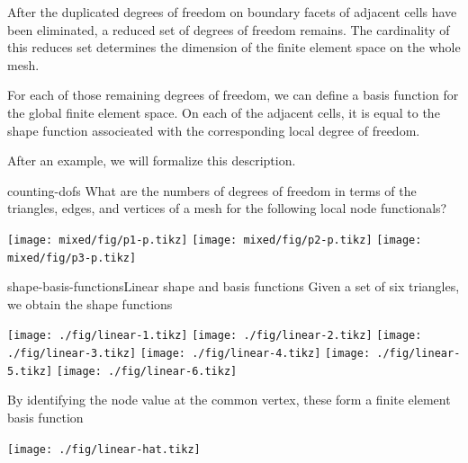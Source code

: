 \begin{intro}
  After the duplicated degrees of freedom on boundary facets of
  adjacent cells have been eliminated, a reduced set of degrees of
  freedom remains. The cardinality of this reduces set determines the
  dimension of the finite element space on the whole mesh.

  For each of those remaining degrees of freedom, we can define a
  basis function for the global finite element space. On each of the
  adjacent cells, it is equal to the shape function associeated with
  the corresponding local degree of freedom.

  After an example, we will formalize this description.
\end{intro}

\begin{Problem}{counting-dofs}
  What are the numbers of degrees of freedom in terms of the
  triangles, edges, and vertices of a mesh for the following local
  node functionals?
  \begin{center}
    \texttt{[image: mixed/fig/p1-p.tikz]}
    \hspace{10mm}
    \texttt{[image: mixed/fig/p2-p.tikz]}
    \hspace{10mm}
    \texttt{[image: mixed/fig/p3-p.tikz]}
  \end{center}
\end{Problem}

\begin{Example*}{shape-basis-functions}{Linear shape and basis functions}
  Given a set of six triangles, we obtain the shape functions
  \begin{center}
    \texttt{[image: ./fig/linear-1.tikz]}
    \texttt{[image: ./fig/linear-2.tikz]}
    \texttt{[image: ./fig/linear-3.tikz]}
    \texttt{[image: ./fig/linear-4.tikz]}
    \texttt{[image: ./fig/linear-5.tikz]}
    \texttt{[image: ./fig/linear-6.tikz]}
  \end{center}
  By identifying the node value at the common vertex, these form a finite element basis function
  \begin{center}
    \texttt{[image: ./fig/linear-hat.tikz]}    
  \end{center}
\end{Example*}

